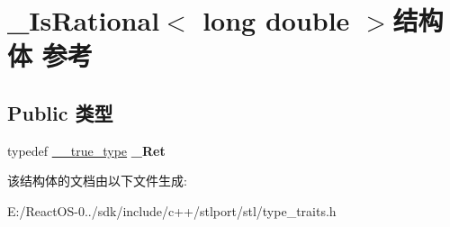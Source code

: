 \hypertarget{struct___is_rational_3_01long_01double_01_4}{}\section{\+\_\+\+Is\+Rational$<$ long double $>$结构体 参考}
\label{struct___is_rational_3_01long_01double_01_4}
\subsection*{Public 类型}
\begin{DoxyCompactItemize}
\item 
\mbox{\label{struct___is_rational_3_01long_01double_01_4_aea7b84b97b981d2bd3f3317688c15073}} 
typedef \hyperlink{struct____true__type}{\+\_\+\+\_\+true\+\_\+type} {\bfseries \+\_\+\+Ret}
\end{DoxyCompactItemize}


该结构体的文档由以下文件生成\+:\begin{DoxyCompactItemize}
\item 
E\+:/\+React\+O\+S-\/0../sdk/include/c++/stlport/stl/type\+\_\+traits.\+h\end{DoxyCompactItemize}

